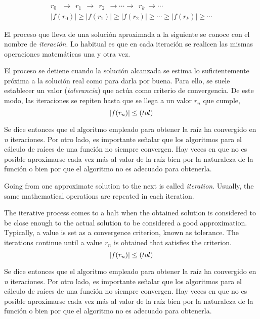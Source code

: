 \begin{align*}
r_0\ \ \  \rightarrow \  \ r_1  \ \ \rightarrow \ \ r_2 \ \ \rightarrow \cdots \rightarrow \ \ r_k \ \rightarrow \cdots\\
\vert f(r_0)\vert \ge \vert f(r_1)\vert \ge \vert f(r_2)\vert \ge \cdots \ge \vert f(r_k)\vert \ge \cdots
\end{align*}
\begin{paracol}{2}
El proceso que lleva de una solución aproximada a la siguiente se conoce con el nombre de \emph{iteración}. Lo habitual es que en cada iteración se realicen las mismas operaciones matemáticas una y otra vez. 

El proceso se detiene cuando la solución alcanzada se estima lo suficientemente próxima a la solución real como para darla por buena. Para ello, se suele establecer un valor (\emph{tolerancia}) que actúa como criterio de convergencia. De este modo, las iteraciones se repiten hasta que se llega a un valor $r_n$ 	que cumple,
\begin{equation*}
\vert f(r_n) \vert \leq \text(tol)
\end{equation*}

Se dice entonces que el algoritmo empleado para obtener la raíz ha convergido en \emph{n} iteraciones. Por otro lado, es importante señalar que los algoritmos para el cálculo de raíces de una función no siempre convergen. Hay veces en que no es posible aproximarse cada vez más al valor de la raíz bien por la naturaleza de la función o bien por que el algoritmo no es adecuado para obtenerla.
\switchcolumn

Going from one approximate solution to the next is called \emph{iteration}. Usually, the same mathematical operations are repeated in each iteration.

The iterative process comes to a halt when the obtained solution is considered to be close enough to the actual solution to be considered a good approximation. Typically, a value is set as a convergence criterion, known as tolerance. The iterations continue until a value $r_n$ is obtained that satisfies the criterion.
\begin{equation*}
\vert f(r_n) \vert \leq \text(tol)
\end{equation*}

Se dice entonces que el algoritmo empleado para obtener la raíz ha convergido en \emph{n} iteraciones. Por otro lado, es importante señalar que los algoritmos para el cálculo de raíces de una función no siempre convergen. Hay veces en que no es posible aproximarse cada vez más al valor de la raíz bien por la naturaleza de la función o bien por que el algoritmo no es adecuado para obtenerla.

\end{paracol}

